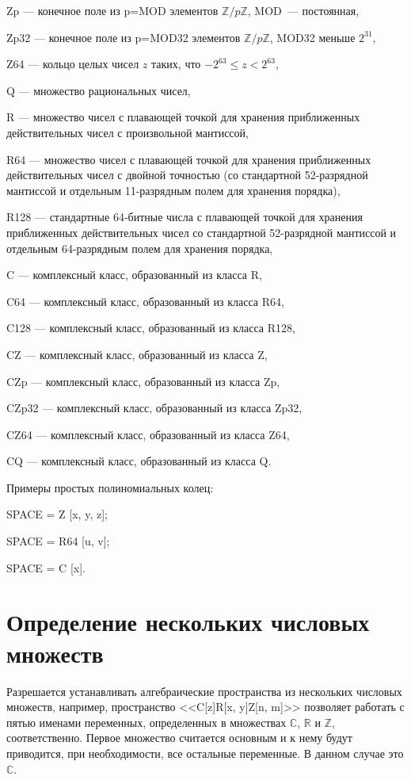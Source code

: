 Zp --- конечное поле из p=MOD элементов  ${\mathbb Z}/p{\mathbb Z}$,  MOD~--- постоянная,  

Zp32 --- конечное поле из p=MOD32 элементов ${\mathbb Z}/p{\mathbb Z}$, MOD32 меньше $2^{31}$, 

Z64 --- кольцо целых чисел $z$ таких,  что $-2^{63} \leqslant z < 2^{63}$,  

Q --- множество рациональных чисел, 
 
R --- множество чисел с плавающей точкой для хранения приближенных действительных чисел с произвольной мантиссой,  

R64 --- множество чисел с плавающей точкой для хранения приближенных действительных чисел с двойной точностью (со стандартной 52-разрядной мантиссой и отдельным 11-разрядным полем для хранения порядка),  
 
R128 --- стандартные 64-битные числа с плавающей точкой для хранения приближенных действительных чисел со стандартной 52-разрядной мантиссой и отдельным 64-разрядным полем для хранения порядка,  

C --- комплексный класс,  образованный из  класса R,  

C64 --- комплексный класс,  образованный из  класса  R64,  

C128 --- комплексный класс,  образованный из  класса  R128, 

CZ --- комплексный класс,  образованный из  класса  Z,  

CZp --- комплексный класс,  образованный из  класса  Zp,  

CZp32 --- комплексный класс,  образованный из  класса  Zp32,  

CZ64 --- комплексный класс,  образованный из  класса  Z64,  

CQ --- комплексный класс,  образованный из  класса  Q.  

Примеры простых полиномиальных колец: 

SPACE = Z [x,  y,  z]; 

SPACE = R64 [u,  v];  

SPACE = C [x]. 

\section{Определение нескольких числовых множеств}


Разрешается устанавливать
алгебраические пространства из нескольких числовых множеств,  например,  пространство <<C[z]R[x, y]Z[n, m]>> позволяет
работать с пятью именами переменных,  определенных в множествах $\mathbb{C}$, $\mathbb{R}$ и $\mathbb{Z}$,  соответственно. 
Первое множество считается основным и к нему будут приводится,  при необходимости, 
все остальные переменные.  В данном случае это $\mathbb{C}$. 


